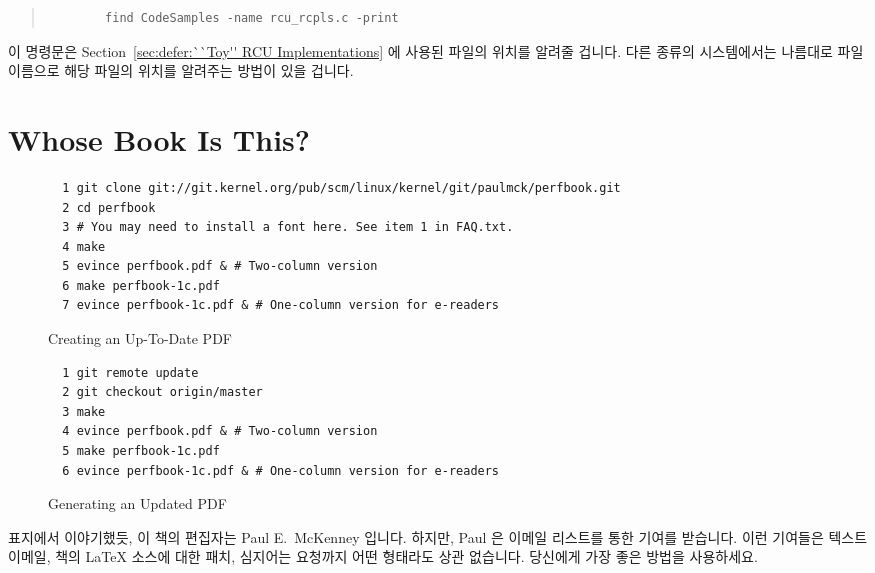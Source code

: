 \begin{quote}
	{\scriptsize
	\begin{verbatim}
		find CodeSamples -name rcu_rcpls.c -print
	\end{verbatim}
	}
\end{quote}

이 명령문은 Section~\ref{sec:defer:``Toy'' RCU Implementations} 에 사용된
 파일의 위치를 알려줄 겁니다.
다른 종류의 시스템에서는 나름대로 파일 이름으로 해당 파일의 위치를 알려주는
방법이 있을 겁니다.

\iffalse
This command will locate the file \co{rcu_rcpls.c}, which is called out in
Section~\ref{sec:defer:``Toy'' RCU Implementations}.
Other types of systems have well-known ways of locating files by filename.
\fi

\section{Whose Book Is This?}
\label{sec:howto:Whose Book Is This?}

\begin{figure*}[tbp]
{
\scriptsize
\begin{verbatim}
  1 git clone git://git.kernel.org/pub/scm/linux/kernel/git/paulmck/perfbook.git
  2 cd perfbook
  3 # You may need to install a font here. See item 1 in FAQ.txt.
  4 make
  5 evince perfbook.pdf & # Two-column version
  6 make perfbook-1c.pdf
  7 evince perfbook-1c.pdf & # One-column version for e-readers
\end{verbatim}
}
\caption{Creating an Up-To-Date PDF}
\label{fig:howto:Creating a Up-To-Date PDF}
\end{figure*}

\begin{figure*}[tbp]
{
\scriptsize
\begin{verbatim}
  1 git remote update
  2 git checkout origin/master
  3 make
  4 evince perfbook.pdf & # Two-column version
  5 make perfbook-1c.pdf
  6 evince perfbook-1c.pdf & # One-column version for e-readers
\end{verbatim}
}
\caption{Generating an Updated PDF}
\label{fig:howto:Generating an Updated PDF}
\end{figure*}

표지에서 이야기했듯, 이 책의 편집자는 Paul E.~McKenney 입니다.
하지만, Paul 은  이메일 리스트를 통한 기여를
받습니다.  이런 기여들은 텍스트 이메일, 책의 \LaTeX{} 소스에 대한 패치,
심지어는  요청까지 어떤 형태라도 상관 없습니다.  당신에게
가장 좋은 방법을 사용하세요.

